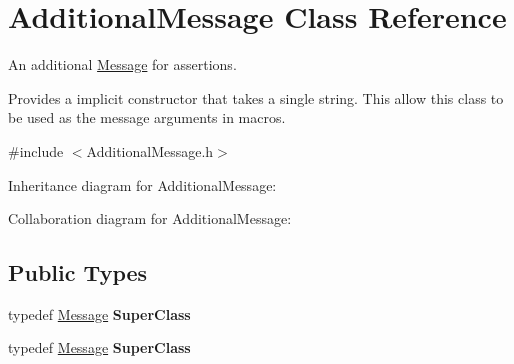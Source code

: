 \hypertarget{class_additional_message}{\section{Additional\+Message Class Reference}
\label{class_additional_message}
}


An additional \hyperlink{class_message}{Message} for assertions.

Provides a implicit constructor that takes a single string. This allow this class to be used as the message arguments in macros.  




{\ttfamily \#include $<$Additional\+Message.\+h$>$}



Inheritance diagram for Additional\+Message\+:


Collaboration diagram for Additional\+Message\+:
\subsection*{Public Types}
\begin{DoxyCompactItemize}
\item 
\hypertarget{class_additional_message_abc8626e28c147b5ddd66032a35676126}{typedef \hyperlink{class_message}{Message} {\bfseries Super\+Class}}\label{class_additional_message_abc8626e28c147b5ddd66032a35676126}

\item 
\hypertarget{class_additional_message_abc8626e28c147b5ddd66032a35676126}{typedef \hyperlink{class_message}{Message} {\bfseries Super\+Class}}\label{class_additional_message_abc8626e28c147b5ddd66032a35676126}

\end{DoxyCompactItemize}

